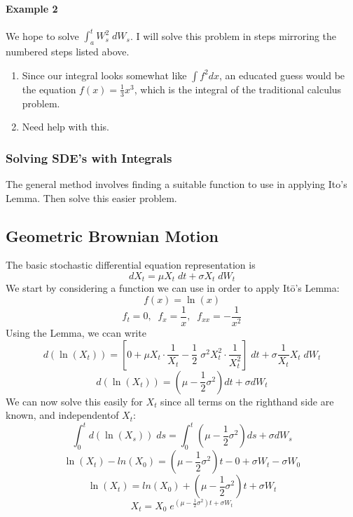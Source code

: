 \documentclass[12pt]{article}
\theoremstyle{plain}
\theoremstyle{definition}
\theoremstyle{remark}
\begin{document}
\paragraph{Example 2} We hope to solve $\int^t_a W^2_s\;dW_s$. I will
solve this problem in steps mirroring the numbered steps listed above.
\begin{enumerate}
   \item{Since our integral looks somewhat like $\int f^2 dx$, an
      educated guess would be the equation $f(x) = \frac{1}{3} x^3$,
      which is the integral of the traditional calculus problem.
      }
   \item{Need help with this.}

\end{enumerate}

\subsubsection{Solving SDE's with Integrals}

The general method involves finding a suitable function to use in
applying It{o}'s Lemma. Then solve this easier problem.


\subsection{Geometric Brownian Motion}

The basic stochastic differential equation representation is
   \[ dX_t = \mu X_t \; dt + \sigma X_t \;dW_t \]
We start by considering a function we can use in order to apply
It\={o}'s Lemma:
   \[ f(x) = \ln(x) \]
   \[ f_t = 0, \;\; f_x = \frac{1}{x}, \;\; f_{xx} = -\frac{1}{x^2} \]
Using the Lemma, we ccan write
   \[ d(\ln(X_t)) = \left[ 0 + \mu X_t \cdot \frac{1}{X_t} -
      \frac{1}{2} \; \sigma^2 X_t^2 \cdot \frac{1}{X_t^2} \right]\; dt
      + \sigma \frac{1}{X_t} X_t\; dW_t \]
   \[ d(\ln(X_t)) = \left( \mu - \frac{1}{2}\sigma^2 \right) dt
      + \sigma dW_t \]
We can now solve this easily for $X_t$ since all terms on the righthand
side are known, and independentof $X_t$:
   \[ \int^t_0 d(\ln(X_s)) \; ds =  \int^t_0 \left( \mu -
      \frac{1}{2}\sigma^2 \right) ds + \sigma dW_s \]
   \[ \ln(X_t) - ln(X_0) = \left( \mu -
      \frac{1}{2}\sigma^2 \right) t - 0 + \sigma W_t - \sigma W_0 \]
   \[ \ln(X_t) = ln(X_0) + \left( \mu -
      \frac{1}{2}\sigma^2 \right) t +  \sigma W_t \]
   \[X_t = X_0 \; e^{\left( \mu -
      \frac{1}{2}\sigma^2 \right) t +  \sigma W_t} \]
\end{document}
